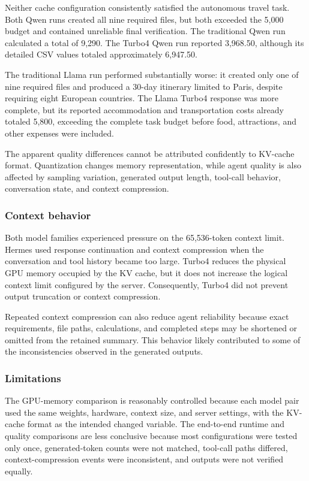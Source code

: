 Neither cache configuration consistently satisfied the autonomous travel
task. Both Qwen runs created all nine required files, but both exceeded the
\texteuro{}5,000 budget and contained unreliable final verification. The
traditional Qwen run calculated a total of \texteuro{}9,290. The Turbo4
Qwen run reported \texteuro{}3,968.50, although its detailed CSV values
totaled approximately \texteuro{}6,947.50.

The traditional Llama run performed substantially worse: it created only
one of nine required files and produced a 30-day itinerary limited to Paris,
despite requiring eight European countries. The Llama Turbo4 response was
more complete, but its reported accommodation and transportation costs
already totaled \texteuro{}5,800, exceeding the complete task budget before
food, attractions, and other expenses were included.

The apparent quality differences cannot be attributed confidently to
KV-cache format. Quantization changes memory representation, while agent
quality is also affected by sampling variation, generated output length,
tool-call behavior, conversation state, and context compression.

\subsubsection{Context behavior}

Both model families experienced pressure on the 65,536-token context limit.
Hermes used response continuation and context compression when the
conversation and tool history became too large. Turbo4 reduces the physical
GPU memory occupied by the KV cache, but it does not increase the logical
context limit configured by the server. Consequently, Turbo4 did not prevent
output truncation or context compression.

Repeated context compression can also reduce agent reliability because exact
requirements, file paths, calculations, and completed steps may be shortened
or omitted from the retained summary. This behavior likely contributed to
some of the inconsistencies observed in the generated outputs.

\subsubsection{Limitations}

The GPU-memory comparison is reasonably controlled because each model pair
used the same weights, hardware, context size, and server settings, with the
KV-cache format as the intended changed variable. The end-to-end runtime and
quality comparisons are less conclusive because most configurations were
tested only once, generated-token counts were not matched, tool-call paths
differed, context-compression events were inconsistent, and outputs were not
verified equally.

